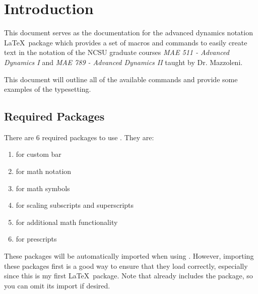 \section{Introduction}
\label{sec:intro}
This document serves as the documentation for the advanced dynamics notation \LaTeX\ package  which provides a set of macros and commands to easily create text in the notation of the NCSU graduate courses \textit{MAE 511 - Advanced Dynamics I} and \textit{MAE 789 - Advanced Dynamics II} taught by Dr. Mazzoleni.

This document will outline all of the available commands and provide some examples of the typesetting.

\subsection{Required Packages}
\label{sec:requirements}
There are 6 required packages to use . They are:
\begin{enumerate}[noitemsep]
	\item {} for custom bar \cite{pack:accents}
	\item {} for math notation \cite{pack:amsmath}
	\item {} for math symbols \cite{pack:amssymb}
	\item {} for scaling subscripts and superscripts \cite{pack:graphicx}
	\item {} for additional math functionality \cite{pack:mathtools}
	\item {} for prescripts \cite{pack:tensor}
\end{enumerate}

These packages will be automatically imported when using . However, importing these packages first is a good way to ensure that they load correctly, especially since this is my first \LaTeX\ package. Note that  already includes the  package, so you can omit its import if desired.

